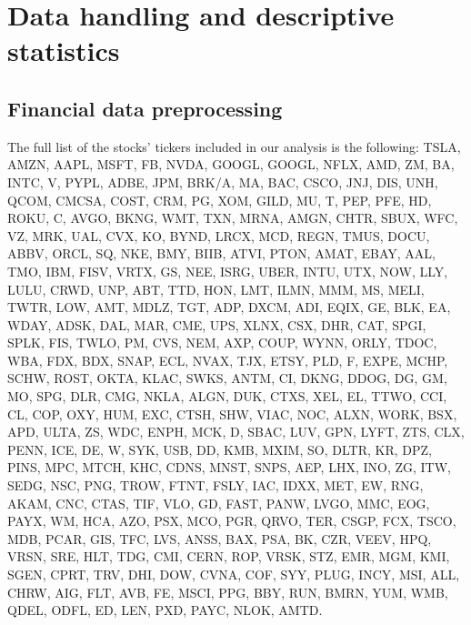 \documentclass[amsmath,amssymb,aps,pre,floatfix,twocolumn,superscriptaddress]{revtex4}
\begin{document}


\clearpage
\onecolumngrid
\appendix

\section{Data handling and descriptive statistics}

\subsection{Financial data preprocessing}

The full list of the stocks' tickers included in our analysis is the following: TSLA, AMZN, AAPL, MSFT, FB, NVDA, GOOGL, GOOGL, NFLX, AMD, ZM, BA, INTC, V, PYPL, ADBE, JPM, BRK/A, MA, BAC, CSCO, JNJ, DIS, UNH, QCOM, CMCSA, COST, CRM, PG, XOM, GILD, MU, T, PEP, PFE, HD, ROKU, C, AVGO, BKNG, WMT, TXN, MRNA, AMGN, CHTR, SBUX, WFC, VZ, MRK, UAL, CVX, KO, BYND, LRCX, MCD, REGN, TMUS, DOCU, ABBV, ORCL, SQ, NKE, BMY, BIIB, ATVI, PTON, AMAT, EBAY, AAL, TMO, IBM, FISV, VRTX, GS, NEE, ISRG, UBER, INTU, UTX, NOW, LLY, LULU, CRWD, UNP, ABT, TTD, HON, LMT, ILMN, MMM, MS, MELI, TWTR, LOW, AMT, MDLZ, TGT, ADP, DXCM, ADI, EQIX, GE, BLK, EA, WDAY, ADSK, DAL, MAR, CME, UPS, XLNX, CSX, DHR, CAT, SPGI, SPLK, FIS, TWLO, PM, CVS, NEM, AXP, COUP, WYNN, ORLY, TDOC, WBA, FDX, BDX, SNAP, ECL, NVAX, TJX, ETSY, PLD, F, EXPE, MCHP, SCHW, ROST, OKTA, KLAC, SWKS, ANTM, CI, DKNG, DDOG, DG, GM, MO, SPG, DLR, CMG, NKLA, ALGN, DUK, CTXS, XEL, EL, TTWO, CCI, CL, COP, OXY, HUM, EXC, CTSH, SHW, VIAC, NOC, ALXN, WORK, BSX, APD, ULTA, ZS, WDC, ENPH, MCK, D, SBAC, LUV, GPN, LYFT, ZTS, CLX, PENN, ICE, DE, W, SYK, USB, DD, KMB, MXIM, SO, DLTR, KR, DPZ, PINS, MPC, MTCH, KHC, CDNS, MNST, SNPS, AEP, LHX, INO, ZG, ITW, SEDG, NSC, PNG, TROW, FTNT, FSLY, IAC, IDXX, MET, EW, RNG, AKAM, CNC, CTAS, TIF, VLO, GD, FAST, PANW, LVGO, MMC, EOG, PAYX, WM, HCA, AZO, PSX, MCO, PGR, QRVO, TER, CSGP, FCX, TSCO, MDB, PCAR, GIS, TFC, LVS, ANSS, BAX, PSA, BK, CZR, VEEV, HPQ, VRSN, SRE, HLT, TDG, CMI, CERN, ROP, VRSK, STZ, EMR, MGM, KMI, SGEN, CPRT, TRV, DHI, DOW, CVNA, COF, SYY, PLUG, INCY, MSI, ALL, CHRW, AIG, FLT, AVB, FE, MSCI, PPG, BBY, RUN, BMRN, YUM, WMB, QDEL, ODFL, ED, LEN, PXD, PAYC, NLOK, AMTD. 
\end{document}
